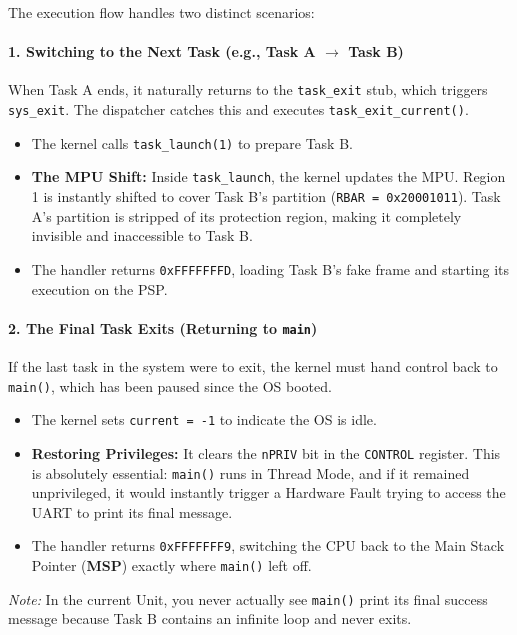 The execution flow handles two distinct scenarios:

\paragraph*{1. Switching to the Next Task (e.g., Task A $\rightarrow$ Task B)}
When Task A ends, it naturally returns to the \texttt{task\_exit} stub, which triggers \texttt{sys\_exit}. The dispatcher catches this and executes \texttt{task\_exit\_current()}.
\begin{itemize}
    \item The kernel calls \texttt{task\_launch(1)} to prepare Task B.
    \item \textbf{The MPU Shift:} Inside \texttt{task\_launch}, the kernel updates the MPU. Region 1 is instantly shifted to cover Task B's partition (\texttt{RBAR = 0x20001011}). Task A's partition is stripped of its protection region, making it completely invisible and inaccessible to Task B.
    \item The handler returns \texttt{0xFFFFFFFD}, loading Task B's fake frame and starting its execution on the PSP.
\end{itemize}

\paragraph*{2. The Final Task Exits (Returning to \texttt{main})}
If the last task in the system were to exit, the kernel must hand control back to \texttt{main()}, which has been paused since the OS booted.
\begin{itemize}
    \item The kernel sets \texttt{current = -1} to indicate the OS is idle.
    \item \textbf{Restoring Privileges:} It clears the \texttt{nPRIV} bit in the \texttt{CONTROL} register. This is absolutely essential: \texttt{main()} runs in Thread Mode, and if it remained unprivileged, it would instantly trigger a Hardware Fault trying to access the UART to print its final message.
    \item The handler returns \texttt{0xFFFFFFF9}, switching the CPU back to the Main Stack Pointer (\textbf{MSP}) exactly where \texttt{main()} left off.
\end{itemize}

\textit{Note:} In the current Unit, you never actually see \texttt{main()} print its final success message because Task B contains an infinite loop and never exits.

